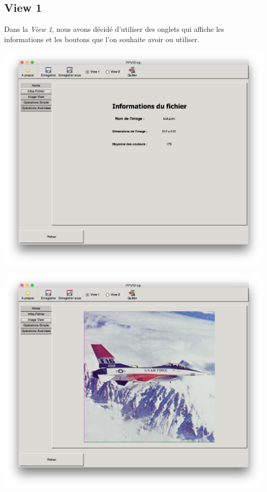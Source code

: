 \documentclass[12pt]{article}
\begin{document}
\subsection{View 1}
Dans la \textit{View 1}, nous avons décidé d'utiliser des onglets qui affiche les informations et les boutons que l'on souhaite avoir ou utiliser. 
\begin{center}
\includegraphics[scale = 0.3]{infosView1}\\
\end{center}
\begin{center}
\includegraphics[scale = 0.3]{imageView1}\\
\end{center}
\end{document}
